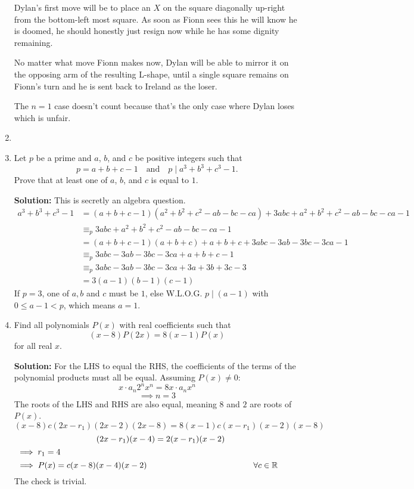 \documentclass{article}
\begin{document}
\begin{enumerate}[itemsep=\fill]
Dylan's first move will be to place an $X$ on the square diagonally up-right from the bottom-left most square. As soon as Fionn sees this he will know he is doomed, he should honestly just resign now while he has some dignity remaining.

No matter what move Fionn makes now, Dylan will be able to mirror it on the opposing arm of the resulting L-shape, until a single square remains on Fionn's turn and he is sent back to Ireland as the loser.

The $n=1$ case doesn't count because that's the only case where Dylan loses which is unfair.


\item %


\item %
Let $p$ be a prime and $a$, $b$, and $c$ be positive integers such that
\[ p = a+b+c-1 \quad \text{and} \quad p \mid a^3+b^3+c^3-1. \]
Prove that at least one of $a$, $b$, and $c$ is equal to $1$.

\textbf{Solution: } This is secretly an algebra question.
\begin{align*}
a^3+b^3+c^3-1 &= (a+b+c-1)(a^2+b^2+c^2-ab-bc-ca)+3abc+a^2+b^2+c^2-ab-bc-ca-1\\
&\equiv_p 3abc+a^2+b^2+c^2-ab-bc-ca-1\\
&= (a+b+c-1)(a+b+c)+a+b+c+3abc-3ab-3bc-3ca-1\\
&\equiv_p 3abc-3ab-3bc-3ca+a+b+c-1\\
&\equiv_p 3abc-3ab-3bc-3ca+3a+3b+3c-3\\
&= 3(a-1)(b-1)(c-1)
\end{align*}
If $p=3$, one of $a,b$ and $c$ must be $1$, else W.L.O.G. $p \mid (a-1)$ with $0\leq a-1<p$, which means $a=1$. 

\item %
Find all polynomials $P(x)$ with real coefficients such that
\[ (x-8)P(2x) = 8(x-1)P(x) \]
for all real $x$.

\textbf{Solution:}
For the LHS to equal the RHS, the coefficients of the terms of the polynomial products must all be equal. Assuming $P(x) \neq 0$:
$$x \cdot a_n 2^nx^n = 8x\cdot a_n x^n$$
$$\implies n = 3$$
The roots of the LHS and RHS are also equal, meaning $8$ and $2$ are roots of $P(x)$.
$$(x-8)c(2x-r_1)(2x-2)(2x-8) = 8(x-1)c(x-r_1)(x-2)(x-8)$$
$$\hspace{3mm}(2x-r_1)(x-4) = 2(x-r_1)(x-2)$$
$$\implies r_1 = 4\hspace{100mm}$$
$$\implies P(x) = c(x-8)(x-4)(x-2) \hspace{45mm} \forall c\in\mathbb{R}\hspace{8mm}$$
The check is trivial.


\end{enumerate}
\end{document}
